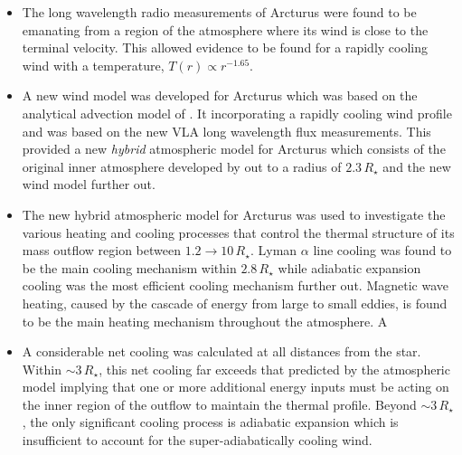 \begin{itemize}
	\item The long wavelength radio measurements of Arcturus were found to be emanating from a region of the atmosphere where its wind is close to the terminal velocity. This allowed evidence to be found for a rapidly cooling wind with a temperature, $T(r) \propto r^{−1.65}$.
	
	\item A new wind model was developed for Arcturus which was based on the analytical advection model of \cite{glassgold_1986}. It incorporating a rapidly cooling wind profile and was based on the new VLA long wavelength flux measurements. This provided a new \textit{hybrid} atmospheric model for Arcturus which consists of the original inner atmosphere developed by \cite{drake_1985} out to a radius of $2.3\,R_{\star}$ and the new wind model further out.

	\item The new hybrid atmospheric model for Arcturus was used to investigate the various heating and cooling processes that control the thermal structure of its mass outflow region between $1.2\rightarrow  10\,R_{\star}$. Lyman $\alpha$ line cooling was found to be the main cooling mechanism within $2.8\,R_{\star}$ while adiabatic expansion cooling was the most efficient cooling mechanism further out. Magnetic wave heating, caused by the cascade of energy from large to small eddies, is found to be the main heating mechanism throughout the atmosphere. A

	\item A considerable net cooling was calculated at all distances from the star. Within $\sim 3\,R_{\star}$, this net cooling far exceeds that predicted by the atmospheric model implying that one or more additional energy inputs must be acting on the inner region of the outflow to maintain the thermal profile. Beyond $\sim 3\,R_{\star}$, the only significant cooling process is adiabatic expansion which is insufficient to account for the super-adiabatically cooling wind.

\end{itemize}

